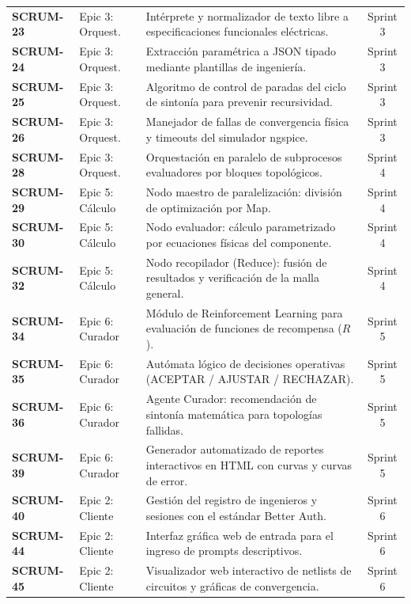 \documentclass[12pt,letterpaper,oneside]{report}
\begin{document}
\begin{xltabular}{\textwidth}{l p{2.8cm} >{\raggedright\arraybackslash}X c}
\textbf{SCRUM-23} & Epic 3: Orquest. & Intérprete y normalizador de texto libre a especificaciones funcionales eléctricas. & Sprint 3 \\
\textbf{SCRUM-24} & Epic 3: Orquest. & Extracción paramétrica a JSON tipado mediante plantillas de ingeniería. & Sprint 3 \\
\textbf{SCRUM-25} & Epic 3: Orquest. & Algoritmo de control de paradas del ciclo de sintonía para prevenir recursividad. & Sprint 3 \\
\textbf{SCRUM-26} & Epic 3: Orquest. & Manejador de fallas de convergencia física y timeouts del simulador ngspice. & Sprint 3 \\

\textbf{SCRUM-28} & Epic 3: Orquest. & Orquestación en paralelo de subprocesos evaluadores por bloques topológicos. & Sprint 4 \\
\textbf{SCRUM-29} & Epic 5: Cálculo & Nodo maestro de paralelización: división de optimización por Map. & Sprint 4 \\
\textbf{SCRUM-30} & Epic 5: Cálculo & Nodo evaluador: cálculo parametrizado por ecuaciones físicas del componente. & Sprint 4 \\
\textbf{SCRUM-32} & Epic 5: Cálculo & Nodo recopilador (Reduce): fusión de resultados y verificación de la malla general. & Sprint 4 \\

\textbf{SCRUM-34} & Epic 6: Curador & Módulo de Reinforcement Learning para evaluación de funciones de recompensa ($R$). & Sprint 5 \\
\textbf{SCRUM-35} & Epic 6: Curador & Autómata lógico de decisiones operativas (ACEPTAR / AJUSTAR / RECHAZAR). & Sprint 5 \\
\textbf{SCRUM-36} & Epic 6: Curador & Agente Curador: recomendación de sintonía matemática para topologías fallidas. & Sprint 5 \\
\textbf{SCRUM-39} & Epic 6: Curador & Generador automatizado de reportes interactivos en HTML con curvas y curvas de error. & Sprint 5 \\

\textbf{SCRUM-40} & Epic 2: Cliente & Gestión del registro de ingenieros y sesiones con el estándar Better Auth. & Sprint 6 \\
\textbf{SCRUM-44} & Epic 2: Cliente & Interfaz gráfica web de entrada para el ingreso de prompts descriptivos. & Sprint 6 \\
\textbf{SCRUM-45} & Epic 2: Cliente & Visualizador web interactivo de netlists de circuitos y gráficas de convergencia. & Sprint 6 \\


\end{xltabular}
\end{document}
